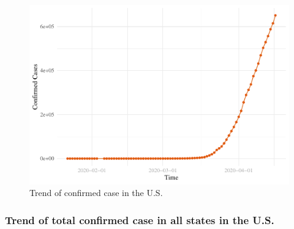 \documentclass[12pt,]{article}
\newenvironment{Shaded}{\begin{snugshade}}{\end{snugshade}}
\newcommand{\DataTypeTok}[1]{\textcolor[rgb]{0.13,0.29,0.53}{#1}}
\newcommand{\KeywordTok}[1]{\textcolor[rgb]{0.13,0.29,0.53}{\textbf{#1}}}
\newcommand{\NormalTok}[1]{#1}
\newcommand{\OperatorTok}[1]{\textcolor[rgb]{0.81,0.36,0.00}{\textbf{#1}}}
\newcommand{\StringTok}[1]{\textcolor[rgb]{0.31,0.60,0.02}{#1}}
\begin{document}
\begin{Shaded}
\end{Shaded}

\begin{figure}
\centering
\includegraphics{Feng_ENV872_Project_files/figure-latex/US_Total_Trend.plot-1.pdf}
\caption{Trend of confirmed case in the U.S.}
\end{figure}

\hypertarget{trend-of-total-confirmed-case-in-all-states-in-the-u.s.}{%
\subsubsection{Trend of total confirmed case in all states in the
U.S.}\label{trend-of-total-confirmed-case-in-all-states-in-the-u.s.}}
\end{document}
